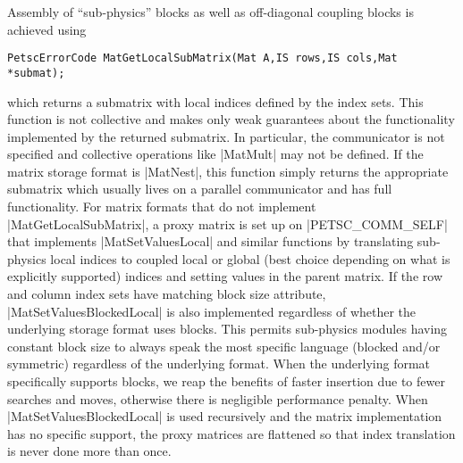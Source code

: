 Assembly of ``sub-physics'' blocks as well as off-diagonal coupling blocks is achieved using
\begin{verbatim}
PetscErrorCode MatGetLocalSubMatrix(Mat A,IS rows,IS cols,Mat *submat);
\end{verbatim}
which returns a submatrix with local indices defined by the index sets.
This function is not collective and makes only weak guarantees about the functionality implemented by the returned submatrix.
In particular, the communicator is not specified and collective operations like \cverb|MatMult| may not be defined.
If the matrix storage format is \cverb|MatNest|, this function simply returns the appropriate submatrix which usually lives on a parallel communicator and has full functionality.
For matrix formats that do not implement \cverb|MatGetLocalSubMatrix|, a proxy matrix is set up on \cverb|PETSC_COMM_SELF| that implements \cverb|MatSetValuesLocal| and similar functions by translating sub-physics local indices to coupled local or global (best choice depending on what is explicitly supported) indices and setting values in the parent matrix.
If the row and column index sets have matching block size attribute, \cverb|MatSetValuesBlockedLocal| is also implemented regardless of whether the underlying storage format uses blocks.
This permits sub-physics modules having constant block size to always speak the most specific language (blocked and/or symmetric) regardless of the underlying format.
When the underlying format specifically supports blocks, we reap the benefits of faster insertion due to fewer searches and moves, otherwise there is negligible performance penalty.
When \cverb|MatSetValuesBlockedLocal| is used recursively and the matrix implementation has no specific support, the proxy matrices are flattened so that index translation is never done more than once.
